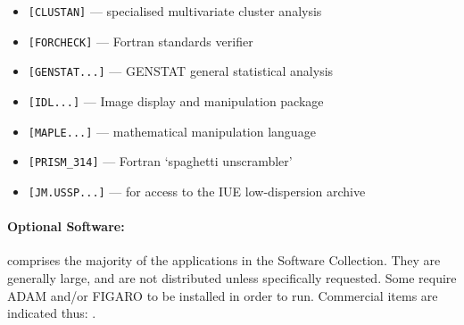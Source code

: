 \begin{itemize}
\item {\tt [CLUSTAN]} --- specialised multivariate cluster analysis
\item {\tt [FORCHECK]} --- Fortran standards verifier
\item {\tt [GENSTAT...]} --- GENSTAT general statistical analysis
\item {\tt [IDL...]} --- Image display and manipulation package
\item {\tt [MAPLE...]} --- mathematical manipulation language
\item {\tt [PRISM\_314]} --- Fortran `spaghetti unscrambler'
\item {\tt [JM.USSP...]} --- for access to the IUE low-dispersion archive
\end{itemize}

\paragraph{Optional Software:} comprises the majority of the applications in
the  Software Collection. They are generally large, and are not distributed
unless specifically requested. Some require ADAM and/or FIGARO to be installed
in order to run. Commercial items are indicated thus: {\tt *}.


